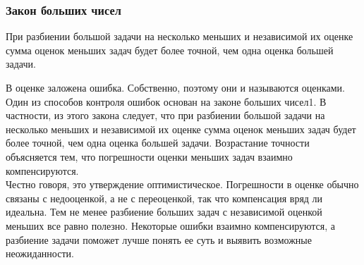 \documentclass{../industrial-development}
\begin{document}
\begin{frame} \frametitle{Закон больших чисел}
\begin{block}{}
  При разбиении большой задачи на несколько меньших и независимой их оценке сумма оценок меньших задач будет более точной, чем одна оценка большей задачи.
\end{block}
\end{frame}
\lecturenotes
В оценке заложена ошибка. Собственно, поэтому они и называются оценками. Один из способов контроля ошибок основан на законе больших чисел1. В частности, из этого закона следует, что при разбиении большой задачи на несколько меньших и независимой их оценке сумма оценок меньших задач будет более точной, чем одна оценка большей задачи. Возрастание точности объясняется тем, что погрешности оценки меньших задач взаимно компенсируются.\\
Честно говоря, это утверждение оптимистическое. Погрешности в оценке обычно связаны с недооценкой, а не с переоценкой, так что компенсация вряд ли идеальна. Тем не менее разбиение больших задач с независимой оценкой меньших все равно полезно. Некоторые ошибки взаимно компенсируются, а разбиение задачи поможет лучше понять ее суть и выявить возможные неожиданности.
\end{document}
